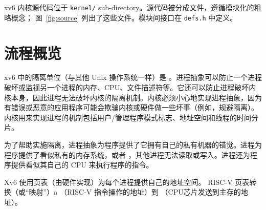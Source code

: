 xv6 内核源代码位于  {\tt kernel/} sub-directory。源代码被分成文件，遵循模块化的粗略概念；
图~\ref{fig:source}    列出了这些文件。模块间接口在 
\lstinline{defs.h}
    中定义。
    \section{流程概览  }     

xv6 中的隔离单位（与其他 Unix 操作系统一样）是
        。进程抽象可以防止一个进程破坏或监视另一个进程的内存、CPU、文件描述符等。它还可以防止进程破坏内核本身，因此进程无法破坏内核的隔离机制。内核必须小心地实现进程抽象，因为有错误或恶意的应用程序可能会欺骗内核或硬件做一些坏事（例如，规避隔离）。内核用来实现进程的机制包括用户/管理程序模式标志、地址空间和线程的时间分片。  

为了帮助实施隔离，进程抽象为程序提供了它拥有自己的私有机器的错觉。进程为程序提供了看似私有的内存系统，或者
        ，其他进程无法读取或写入。进程还为程序提供看似其自己的 CPU 来执行程序的指令。  

Xv6 使用页表（由硬件实现）为每个进程提供自己的地址空间。 RISC-V 页表转换（或“映射”）a
       （RISC-V 指令操作的地址）到
       （CPU芯片发送到主存的地址）。  


